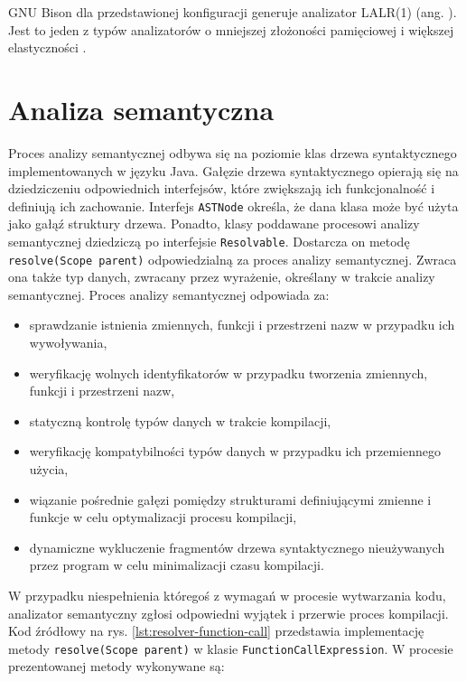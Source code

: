 GNU Bison dla przedstawionej konfiguracji generuje analizator LALR(1) (ang.  ). Jest to jeden z typów analizatorów o mniejszej złożoności pamięciowej i większej elastyczności \cytowanie.

\section{Analiza semantyczna}

Proces analizy semantycznej odbywa się na poziomie klas drzewa syntaktycznego implementowanych w języku Java. Gałęzie drzewa syntaktycznego opierają się na dziedziczeniu odpowiednich interfejsów, które zwiększają ich funkcjonalność i definiują ich zachowanie. Interfejs \lstinline|ASTNode| określa, że dana klasa może być użyta jako gałąź struktury drzewa. Ponadto, klasy poddawane procesowi analizy semantycznej dziedziczą po interfejsie \lstinline|Resolvable|. Dostarcza on metodę \lstinline|resolve(Scope parent)| odpowiedzialną za proces analizy semantycznej. Zwraca ona także typ danych, zwracany przez wyrażenie, określany w trakcie analizy semantycznej.   Proces analizy semantycznej odpowiada za:
\begin{itemize}
\item sprawdzanie istnienia zmiennych, funkcji i przestrzeni nazw w przypadku ich wywoływania,
\item weryfikację wolnych identyfikatorów w przypadku tworzenia zmiennych, funkcji i przestrzeni nazw,
\item statyczną kontrolę typów danych w trakcie kompilacji,
\item weryfikację kompatybilności typów danych w przypadku ich przemiennego użycia,
\item wiązanie pośrednie gałęzi pomiędzy strukturami definiującymi zmienne i funkcje w celu optymalizacji procesu kompilacji,
\item dynamiczne wykluczenie fragmentów drzewa syntaktycznego nieużywanych przez program w celu minimalizacji czasu kompilacji.
\end{itemize}
W przypadku niespełnienia któregoś z wymagań w procesie wytwarzania kodu, analizator semantyczny zgłosi odpowiedni wyjątek i przerwie proces kompilacji. Kod źródłowy na rys.  \ref{lst:resolver-function-call} przedstawia implementację metody \lstinline|resolve(Scope parent)| w klasie \mbox{\lstinline|FunctionCallExpression|.} W procesie prezentowanej metody wykonywane są:
